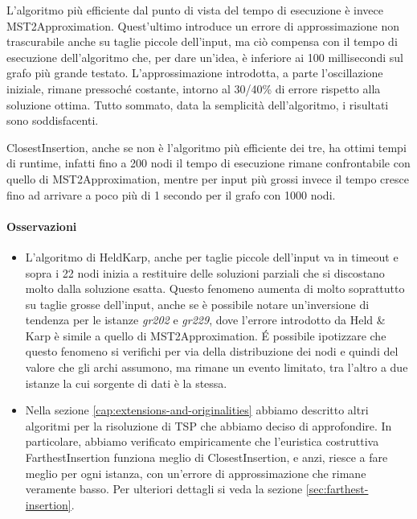 \noindent L'algoritmo più efficiente dal punto di vista del tempo di
esecuzione è invece MST2Approximation.  Quest'ultimo introduce un
errore di approssimazione non trascurabile anche su taglie piccole
dell'input, ma ciò compensa con il tempo di esecuzione dell'algoritmo
che, per dare un'idea, è inferiore ai 100 millisecondi sul grafo più
grande testato. L'approssimazione introdotta, a parte l'oscillazione
iniziale, rimane pressoché costante, intorno al 30/40\% di errore
rispetto alla soluzione ottima. Tutto sommato, data la semplicità
dell'algoritmo, i risultati sono soddisfacenti.

\noindent ClosestInsertion, anche se non è l'algoritmo più efficiente
dei tre, ha ottimi tempi di runtime, infatti fino a 200 nodi il tempo
di esecuzione rimane confrontabile con quello di MST2Approximation,
mentre per input più grossi invece il tempo cresce fino ad arrivare a
poco più di 1 secondo per il grafo con 1000 nodi.

\paragraph{Osservazioni}

\begin{itemize}
    \item L'algoritmo di HeldKarp, anche per taglie piccole dell'input
      va in timeout e sopra i 22 nodi inizia a restituire delle
      soluzioni parziali che si discostano molto dalla soluzione
      esatta. Questo fenomeno aumenta di molto soprattutto su taglie
      grosse dell'input, anche se è possibile notare un'inversione di
      tendenza per le istanze \emph{gr202} e \emph{gr229}, dove
      l'errore introdotto da Held \& Karp è simile a quello di
      MST2Approximation. \'E possibile ipotizzare che questo fenomeno
      si verifichi per via della distribuzione dei nodi e quindi del
      valore che gli archi assumono, ma rimane un evento limitato, tra
      l'altro a due istanze la cui sorgente di dati è la stessa. \\

    \item Nella sezione \ref{cap:extensions-and-originalities} abbiamo
      descritto altri algoritmi per la risoluzione di TSP che abbiamo
      deciso di approfondire. In particolare, abbiamo verificato
      empiricamente che l'euristica costruttiva FarthestInsertion
      funziona meglio di ClosestInsertion, e anzi, riesce a fare
      meglio per ogni istanza, con un'errore di approssimazione che
      rimane veramente basso. Per ulteriori dettagli si veda la
      sezione \ref{sec:farthest-insertion}. \\
\end{itemize}
